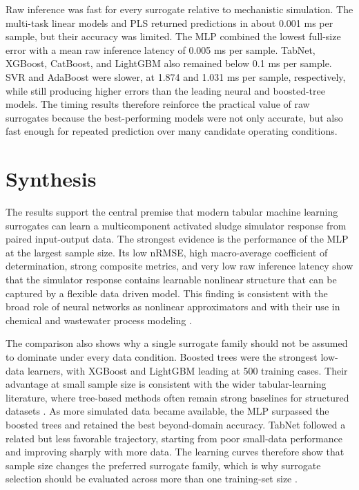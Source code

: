 \documentclass[12pt, twoside]{book}
\begin{document}
Raw inference was fast for every surrogate relative to mechanistic simulation. The multi-task linear models
and PLS returned predictions in about 0.001 ms per sample, but their accuracy was limited. The MLP combined the
lowest full-size error with a mean raw inference latency of 0.005 ms per sample. TabNet, XGBoost, CatBoost,
and LightGBM also remained below 0.1 ms per sample. SVR and AdaBoost were slower, at 1.874 and 1.031 ms per
sample, respectively, while still producing higher errors than the leading neural and boosted-tree models.
The timing results therefore reinforce the practical value of raw surrogates because the best-performing
models were not only accurate, but also fast enough for repeated prediction over many candidate operating
conditions.

\section{Synthesis}

The results support the central premise that modern tabular machine learning surrogates can learn a
multicomponent activated sludge simulator response from paired input-output data. The strongest evidence is
the performance of the MLP at the largest sample size. Its low nRMSE, high macro-average coefficient of
determination, strong composite metrics, and very low raw inference latency show that the simulator response
contains learnable nonlinear structure that can be captured by a flexible data driven model. This finding is
consistent with the broad role of neural networks as nonlinear approximators and with their use in chemical
and wastewater process modeling \citep{Hornik1989,Curteanu2011,Sadeghassadi2018}.

The comparison also shows why a single surrogate family should not be assumed to dominate under every data
condition. Boosted trees were the strongest low-data learners, with XGBoost and LightGBM leading at 500
training cases. Their advantage at small sample size is consistent with the wider tabular-learning literature,
where tree-based methods often remain strong baselines for structured datasets \citep{Borisov2024,ShwartzZiv2022}.
As more simulated data became available, the MLP surpassed the boosted trees and retained the best
beyond-domain accuracy. TabNet followed a related but less favorable trajectory, starting from poor small-data
performance and improving sharply with more data. The learning curves therefore show that sample size changes
the preferred surrogate family, which is why surrogate selection should be evaluated across more than one
training-set size \citep{VieringLoog2023}.
\end{document}
